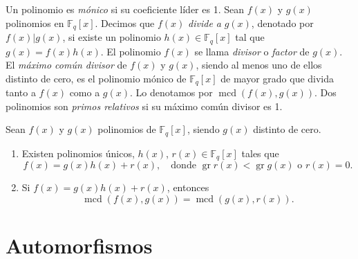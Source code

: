 Un polinomio es \textit{mónico} si su coeficiente líder es 1.
Sean \(f(x)\) y \(g(x)\) polinomios en \(\mathbb F_q[x]\).
Decimos que \(f(x)\) \textit{divide a} \(g(x)\), denotado por \(f(x) | g(x)\), si existe un polinomio \(h(x) \in \mathbb F_q[x]\) tal que \(g(x) = f(x)h(x)\).
El polinomio \(f(x)\) se llama \textit{divisor} o \textit{factor} de \(g(x)\).
El \textit{máximo común divisor} de \(f(x)\) y \(g(x)\), siendo al menos uno de ellos distinto de cero, es el polinomio mónico de \(\mathbb F_q[x]\) de mayor grado que divida tanto a \(f(x)\) como a \(g(x)\).
Lo denotamos por \(\operatorname{mcd}(f(x), g(x))\).
Dos polinomios son \textit{primos relativos} si su máximo común divisor es 1.



\begin{theorem}
  Sean \(f(x)\) y \(g(x)\) polinomios de \(\mathbb F_q[x]\), siendo \(g(x)\) distinto de cero.
  \begin{enumerate}
    \item Existen polinomios únicos, \(h(x)\), \(r(x) \in \mathbb F_q[x]\) tales que \[
      f(x) = g(x)h(x) + r(x), \quad \text{donde } \operatorname{gr} r(x) < \operatorname{gr} g(x) \text{ o } r(x) = 0. 
    \]
    \item Si \(f(x) = g(x)h(x) + r(x)\), entonces \[\operatorname{mcd}(f(x), g(x)) = \operatorname{mcd}(g(x), r(x)).\]
  \end{enumerate}
\end{theorem}

\section{Automorfismos}



